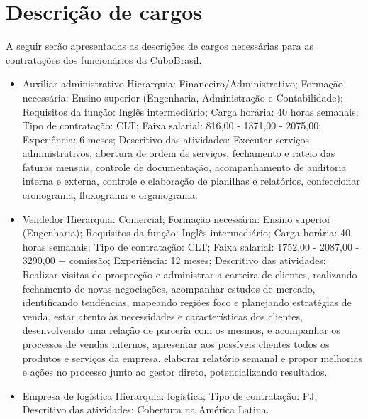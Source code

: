 \documentclass[
	12pt,				%
	openright,			%
	oneside,			%
	a4paper,			%
	english,			%
	french,				%
	spanish,			%
	brazil				%
	]{abntex2}
\begin{document}
\section[Descrição de cargos]{Descrição de cargos}

	A seguir serão apresentadas as descrições de cargos necessárias para as contratações dos funcionários da CuboBrasil.
	
	\begin{itemize}
		\item Auxiliar administrativo
		\subitem Hierarquia: Financeiro/Administrativo;
		\subitem Formação necessária: Ensino superior (Engenharia, Administração e Contabilidade);
		\subitem Requisitos da função: Inglês intermediário;
		\subitem Carga horária: 40 horas semanais;
		\subitem Tipo de contratação: CLT;
		\subitem Faixa salarial: 816,00 - 1371,00 - 2075,00;
		\subitem Experiência: 6 meses;
		\subitem Descritivo das atividades: Executar serviços administrativos, abertura de ordem de serviços, fechamento e rateio das faturas mensais, controle de documentação, acompanhamento de auditoria interna e externa, controle e elaboração de planilhas e relatórios, confeccionar cronograma, fluxograma e organograma.
		
		\item Vendedor
		\subitem Hierarquia: Comercial;
		\subitem Formação necessária: Ensino superior (Engenharia);
		\subitem Requisitos da função: Inglês intermediário;
		\subitem Carga horária: 40 horas semanais;
		\subitem Tipo de contratação: CLT;
		\subitem Faixa salarial: 1752,00 - 2087,00 - 3290,00 + comissão;
		\subitem Experiência: 12 meses;
		\subitem Descritivo das atividades: Realizar visitas de prospecção e administrar a carteira de clientes, realizando fechamento de novas negociações, acompanhar estudos de mercado, identificando tendências, mapeando regiões foco e planejando estratégias de venda, estar atento às necessidades e características dos clientes, desenvolvendo uma relação de parceria com os mesmos, e acompanhar os processos de vendas internos, apresentar aos possíveis clientes todos os produtos e serviços da empresa, elaborar relatório semanal e propor melhorias e ações no processo junto ao gestor direto, potencializando resultados.
		
		\item Empresa de logística
		\subitem Hierarquia: logística;
		\subitem Tipo de contratação: PJ;
		\subitem Descritivo das atividades: Cobertura na América Latina.
		

\end{itemize}
\end{document}
